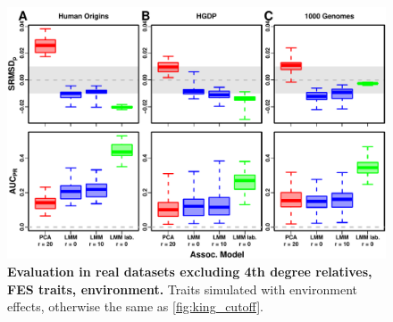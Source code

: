 \documentclass[11pt]{article}
\begin{document}
\begin{linenumbers}
\begin{figure}[hp]
  \centering
  \includegraphics[width=\textwidth]{fes/m_causal_fac-27/h0.3/env0.3-0.2/rmsd-auc_king-cutoff-4.pdf}
  \caption{
    {\bf Evaluation in real datasets excluding 4th degree relatives, FES traits, environment.}
    Traits simulated with environment effects, otherwise the same as \cref{fig:king_cutoff}.
  }
  \label{fig:king_cutoff-env}
\end{figure}


\end{linenumbers}
\end{document}
